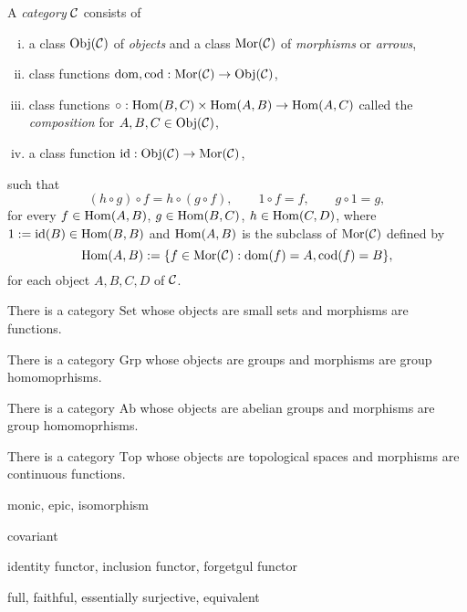 \documentclass{../../large}
\begin{document}
\begin{prb}[Categories]
A \emph{category} $\mathcal{C}$ consists of
\begin{enumerate}[(i)]
\item a class $\operatorname{Obj}(\mathcal{C})$ of \emph{objects} and a class $\operatorname{Mor}(\mathcal{C})$ of \emph{morphisms} or \emph{arrows},
\item class functions $\operatorname{dom},\operatorname{cod}:\operatorname{Mor}(\mathcal{C})\to\operatorname{Obj}(\mathcal{C})$,
\item class functions $\circ:\operatorname{Hom}(B,C)\times\operatorname{Hom}(A,B)\to\operatorname{Hom}(A,C)$ called the \emph{composition} for $A,B,C\in\operatorname{Obj}(\mathcal{C})$,
\item a class function $\operatorname{id}:\operatorname{Obj}(\mathcal{C})\to\operatorname{Mor}(\mathcal{C})$,
\end{enumerate}
such that
\[(h\circ g)\circ f=h\circ(g\circ f),\qquad 1\circ f=f,\qquad g\circ1=g,\]
for every $f\in\operatorname{Hom}(A,B)$, $g\in\operatorname{Hom}(B,C)$, $h\in\operatorname{Hom}(C,D)$, where $1:=\operatorname{id}(B)\in\operatorname{Hom}(B,B)$ and $\operatorname{Hom}(A,B)$ is the subclass of $\operatorname{Mor}(\mathcal{C})$ defined by
\[\operatorname{Hom}(A,B):=\{f\in\operatorname{Mor}(\mathcal{C}):\operatorname{dom}(f)=A,\operatorname{cod}(f)=B\},\]
for each object $A,B,C,D$ of $\mathcal{C}$.
\begin{parts}
\item There is a category $\mathrm{Set}$ whose objects are small sets and morphisms are functions.
\item There is a category $\mathrm{Grp}$ whose objects are groups and morphisms are group homomoprhisms.
\item There is a category $\mathrm{Ab}$ whose objects are abelian groups and morphisms are group homomoprhisms.
\item There is a category $\mathrm{Top}$ whose objects are topological spaces and morphisms are continuous functions.
\end{parts}
\end{prb}


\begin{prb}
monic, epic, isomorphism


\end{prb}



\begin{prb}[Functors]

covariant



identity functor, inclusion functor, forgetgul functor
\end{prb}



\begin{prb}
full, faithful, essentially surjective, equivalent

\end{prb}
\end{document}
